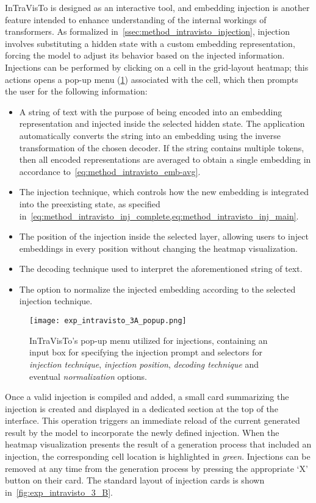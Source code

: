 InTraVisTo is designed as an interactive tool, and embedding injection is another feature intended to enhance understanding of the internal workings of transformers.
As formalized in~\cref{ssec:method_intravisto_injection}, injection involves substituting a hidden state with a custom embedding representation, forcing the model to adjust its behavior based on the injected information.
Injections can be performed by clicking on a cell in the grid-layout heatmap; this actions opens a pop-up menu (\cref{fig:exp_intravisto_3_A}) associated with the cell, which then prompts the user for the following information:
\begin{itemize}
    \item A string of text with the purpose of being encoded into an embedding representation and injected inside the selected hidden state.
The application automatically converts the string into an embedding using the inverse transformation of the chosen decoder.
If the string contains multiple tokens, then all encoded representations are averaged to obtain a single embedding in accordance to~\cref{eq:method_intravisto_emb-avg}.
    \item The injection technique, which controls how the new embedding is integrated into the preexisting state, as specified in~\cref{eq:method_intravisto_inj_complete,eq:method_intravisto_inj_main}.
    \item The position of the injection inside the selected layer, allowing users to inject embeddings in every position without changing the heatmap visualization.
    \item The decoding technique used to interpret the aforementioned string of text.
    \item The option to normalize the injected embedding according to the selected injection technique.
\end{itemize}

\begin{figure}[t!]
    \centering
    \texttt{[image: exp\_intravisto\_3A\_popup.png]}
    \caption[InTraVisTo's pop-up menu utilized for injections.]{InTraVisTo's pop-up menu utilized for injections, containing an input box for specifying the injection prompt and selectors for \emph{injection technique}, \emph{injection position}, \emph{decoding technique} and eventual \emph{normalization} options.}
    \label{fig:exp_intravisto_3_A}
\end{figure}

Once a valid injection is compiled and added, a small card summarizing the injection is created and displayed in a dedicated section at the top of the interface.
This operation triggers an immediate reload of the current generated result by the model to incorporate the newly defined injection.
When the heatmap visualization presents the result of a generation process that included an injection, the corresponding cell location is highlighted in \emph{green}.
Injections can be removed at any time from the generation process by pressing the appropriate `X' button on their card.
The standard layout of injection cards is shown in~\cref{fig:exp_intravisto_3_B}.


